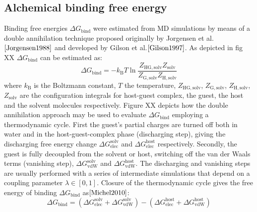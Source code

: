 \documentclass[11pt,oneside,a4paper]{article}
\begin{document}
\subsection{Alchemical binding free energy}
\label{sec:freeenergy}
Binding free energies $\Delta G_{\mathrm{bind}}$ were estimated from MD simulations by means of a double annihilation technique proposed originally by Jorgensen et al.$\cite{Jorgensen1988}$ and developed by Gilson et al.$\cite{Gilson1997}$. As depicted in fig XX $\Delta G_{\mathrm{bind}}$ can be estimated as:
\begin{equation}
 \label{eq:dgbind}
 \Delta G_{\mathrm{bind}} = -k_{\mathrm{B}}T \ln \frac{Z_{\mathrm{HG,solv}} Z_{\mathrm{solv}}} {Z_{\mathrm{G,solv}} Z_{\mathrm{H,solv}} }
\end{equation}
where $k_{\mathrm{B}}$ is the Boltzmann constant, $T$ the temperature, $Z_{\mathrm{HG,solv}}$, $Z_{\mathrm{G,solv}}$, $Z_{\mathrm{H,solv}}$,$Z_{\mathrm{solv}}$ are the configuration integrals for host-guest complex, the guest, the host and the solvent molecules respectively. Figure XX depicts how the double annihilation approach may be used to evaluate $\Delta G_{\mathrm{bind}}$ employing a thermodynamic cycle. First the guest's partial charges are turned off both in water and in the host-guest-complex phase (discharging step), giving the discharging free energy change $\Delta G_{\mathrm{elec}}^{\mathrm{solv}}$ and $\Delta G_{\mathrm{elec}}^{\mathrm{host}}$ respectively. Secondly, the guest is fully decoupled from the solvent or host, switching off the van der Waals terms (vanishing step), $\Delta G_{\mathrm{vdW}}^{\mathrm{solv}}$ and $\Delta G_{\mathrm{vdW}}^{\mathrm{host}}$. The discharging and vanishing steps are usually performed with a series of intermediate simulations that depend on a coupling parameter $\lambda \in [0,1]$. Closure of the thermodynamic cycle gives the free energy of binding $\Delta G_{\mathrm{bind}}$ as$\cite{Michel2010}$:
\begin{equation}
 \label{eq:annihilation}
 \Delta G_{\mathrm{bind}} = ( \Delta G_{\mathrm{elec}}^{\mathrm{solv}} + \Delta G_{\mathrm{vdW}}^{\mathrm{solv}} ) -
 (\Delta G_{\mathrm{elec}}^{\mathrm{host}} + \Delta G_{\mathrm{vdW}}^{\mathrm{host}} )
\end{equation}
\end{document}
